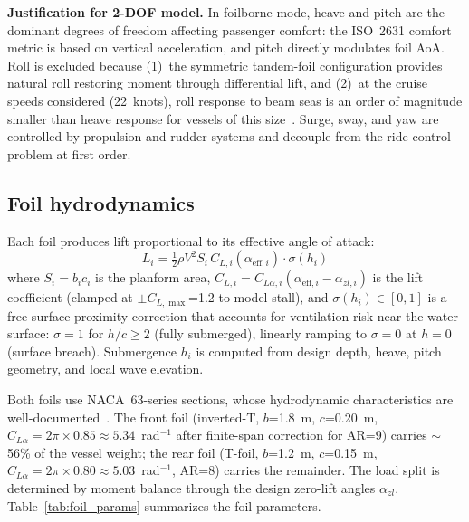 \documentclass[review]{elsarticle}
\begin{document}
\textbf{Justification for 2-DOF model.}
In foilborne mode, heave and pitch are the dominant degrees of freedom
affecting passenger comfort: the ISO~2631 comfort metric is based
on vertical acceleration, and pitch directly modulates foil AoA.
Roll is excluded because
(1)~the symmetric tandem-foil configuration provides natural roll
    restoring moment through differential lift, and
(2)~at the cruise speeds considered (22~knots), roll response to
    beam seas is an order of magnitude smaller than heave response
    for vessels of this size~\citep{faltinsen2005}.
Surge, sway, and yaw are controlled by propulsion and rudder systems
and decouple from the ride control problem at first order.

\subsection{Foil hydrodynamics}

Each foil produces lift proportional to its effective angle of attack:
\begin{equation}
  L_i = \tfrac{1}{2} \rho V^2 S_i \, C_{L,i}(\alpha_{\text{eff},i}) \cdot \sigma(h_i)
  \label{eq:lift}
\end{equation}
where $S_i = b_i c_i$ is the planform area,
$C_{L,i} = C_{L\alpha,i}(\alpha_{\text{eff},i} - \alpha_{zl,i})$
is the lift coefficient (clamped at $\pm C_{L,\max}$=1.2 to model stall),
and $\sigma(h_i) \in [0, 1]$ is a free-surface proximity correction
that accounts for ventilation risk near the water surface:
$\sigma = 1$ for $h/c \geq 2$ (fully submerged),
linearly ramping to $\sigma = 0$ at $h = 0$ (surface breach).
Submergence $h_i$ is computed from design depth, heave, pitch
geometry, and local wave elevation.

Both foils use NACA~63-series sections, whose hydrodynamic
characteristics are well-documented~\citep{abbott1959}.
The front foil (inverted-T, $b$=1.8~m, $c$=0.20~m,
$C_{L\alpha} = 2\pi \times 0.85 \approx 5.34$~rad$^{-1}$ after
finite-span correction for AR=9)
carries $\sim$56\% of the vessel weight; the rear foil (T-foil,
$b$=1.2~m, $c$=0.15~m,
$C_{L\alpha} = 2\pi \times 0.80 \approx 5.03$~rad$^{-1}$, AR=8)
carries the remainder.
The load split is determined by moment balance through the design
zero-lift angles $\alpha_{zl}$.
Table~\ref{tab:foil_params} summarizes the foil parameters.
\end{document}
